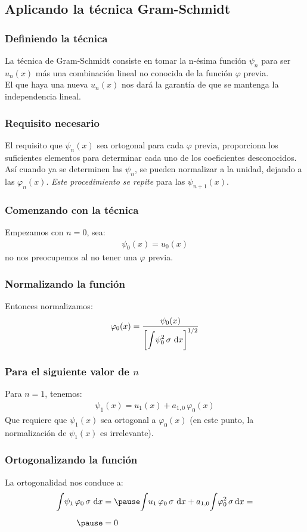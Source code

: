 \documentclass[12pt]{beamer}
\begin{document}
\subsection{Aplicando la técnica Gram-Schmidt}

\begin{frame}
\frametitle{Definiendo la técnica}
La técnica de Gram-Schmidt consiste en tomar la n-ésima función $\psi_{n}$ para ser $u_{n}(x)$ más una combinación lineal no conocida de la función $\varphi$ previa.
\\
\bigskip
\pause
El que haya una nueva $u_{n}(x)$ nos dará la garantía de que se mantenga la independencia lineal.
\end{frame}
\begin{frame}
\frametitle{Requisito necesario}
El requisito que $\psi_{n}(x)$ sea ortogonal para cada $\varphi$ previa, proporciona los suficientes elementos para determinar cada uno de los coeficientes desconocidos.
\\
\bigskip
\pause
Así cuando ya se determinen las $\psi_{n}$, se pueden normalizar a la unidad, dejando a las  $\varphi_{n} (x)$. \pause \emph{Este procedimiento se repite} para las $\psi_{n+1}(x)$.
\end{frame}
\begin{frame}
\frametitle{Comenzando con la técnica}
Empezamos con $n = 0$, sea:
\pause
\begin{align}
\psi_{0} (x) = u_{0} (x)
\label{eq:ecuacion_10_41}
\end{align}
\pause
no nos preocupemos al no tener una $\varphi$ previa.
\end{frame}
\begin{frame}
\frametitle{Normalizando la función}
Entonces normalizamos:
\pause
\begin{align}
\varphi_{0}(x) = \dfrac{\psi_{0} (x)}{\left[ \displaystyle \scaleint{5ex} \psi_{0}^{2} \, \sigma \, \dd{x} \right]^{1/2}}
\label{eq:ecuacion_10_42}
\end{align}
\end{frame}
\begin{frame}
\frametitle{Para el siguiente valor de $n$}
Para $n = 1$, tenemos:
\pause
\begin{align}
\psi_{1} (x) = u_{1} (x) + a_{1, 0} \, \varphi_{0} (x)
\label{eq:ecuacion_10_43}
\end{align}
\pause
Que requiere que $\psi_{1} (x)$ sea ortogonal a $\varphi_{0} (x)$ (en este punto, la normalización de $\psi_{1} (x)$ es irrelevante).
\end{frame}
\begin{frame}
\frametitle{Ortogonalizando la función}
La ortogonalidad nos conduce a:
\pause
\begin{eqnarray}
\begin{aligned}[b]
\scaleint{5ex} \psi_{1} \, \varphi_{0} \, \sigma \, \dd{x} &= \pause \scaleint{5ex} u_{1} \, \varphi_{0} \, \sigma \, \dd{x} + a_{1,0} \scaleint{5ex} \varphi_{0}^{2} \, \sigma \dd{x} = \\[0.5em] \pause
&= 0
\end{aligned}
\label{eq:ecuacion_10_44}
\end{eqnarray}
\end{frame}
\end{document}

